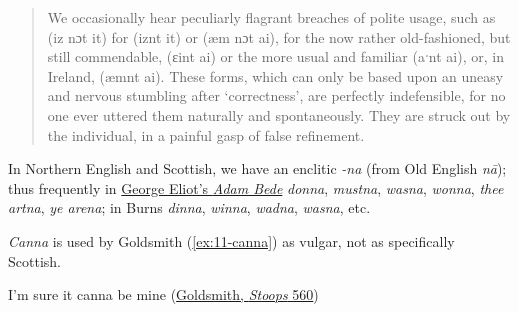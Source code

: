 \begin{quote}
We occasionally hear peculiarly flagrant breaches of polite usage, such as (iz nɔt it) for (iznt it) or (æm nɔt ai), for the now rather old-fashioned, but still commendable, (ɛint ai) or the more usual and familiar (aˑnt ai), or, in Ireland, (æmnt ai). These forms, which can only be based upon an uneasy and nervous stumbling after `correctness', are perfectly indefensible, for no one ever uttered them naturally and spontaneously. They are struck out by the individual, in a painful gasp of false refinement.
\end{quote}


In Northern English and Scottish, we have an enclitic \textit{-na} (from Old English \textit{nā}); thus frequently in \href{https://www.gutenberg.org/cache/epub/507/pg507-images.html}{George Eliot's \textit{Adam Bede}} \textit{donna}, \textit{mustna}, \textit{wasna}, \textit{wonna}, \textit{thee artna}, \textit{ye arena}; in Burns \textit{dinna}, \textit{winna}, \textit{wadna}, \textit{wasna}, etc.

\textit{Canna} is used by Goldsmith (\ref{ex:11-canna}) as vulgar, not as specifically Scottish.

\ea \label{ex:11-canna}
I'm sure it canna be mine \hfill(\href{https://archive.org/details/shestoopstoconqu03gold/page/30/mode/2up?q=%22canna%22&view=theater}{Goldsmith, \textit{Stoops} 560})
\z 
{}

